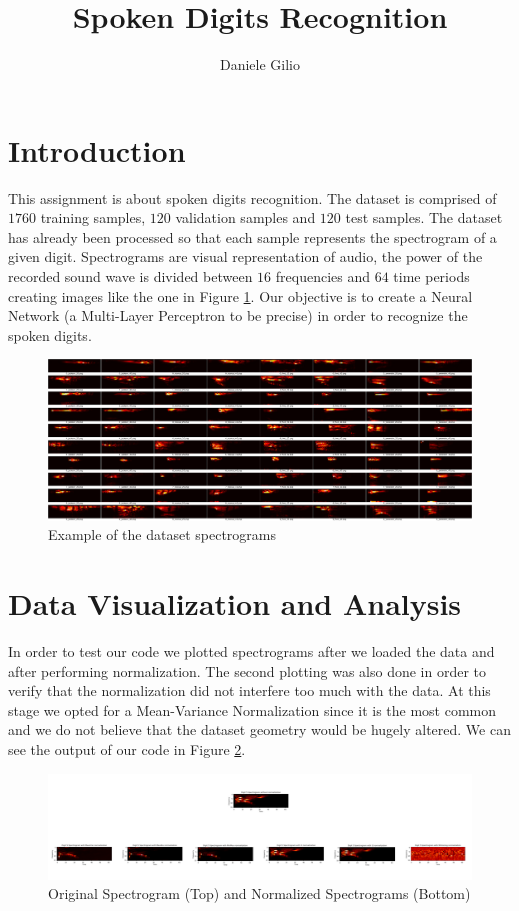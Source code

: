 \documentclass[10pt,a4paper]{report}
\author{Daniele Gilio}
\title{Spoken Digits Recognition}
\begin{document}
\maketitle
\section{Introduction}
This assignment is about spoken digits recognition. The dataset is comprised of $1760$ training samples, $120$ validation samples and $120$ test samples. The dataset has already been processed so that each sample represents the spectrogram of a given digit. Spectrograms are visual representation of audio, the power of the recorded sound wave is divided between $16$ frequencies and $64$ time periods creating images like the one in Figure \ref{fig:data_spect}. Our objective is to create a Neural Network (a Multi-Layer Perceptron to be precise) in order to recognize the spoken digits.
\begin{figure}[!ht]
\centering
\includegraphics[width=\linewidth]{spoken-digits/spectrograms.png}
\caption{Example of the dataset spectrograms}
\label{fig:data_spect}
\end{figure}
\section{Data Visualization and Analysis}
In order to test our code we plotted spectrograms after we loaded the data and after performing normalization. The second plotting was also done in order to verify that the normalization did not interfere too much with the data. At this stage we opted for a Mean-Variance Normalization since it is the most common and we do not believe that the dataset geometry would be hugely altered. We can see the output of our code in Figure \ref{fig:norm_spect}.
\begin{figure}[!ht]
\centering
\includegraphics[width=\linewidth]{norm_spect.png}
\caption{Original Spectrogram (Top) and Normalized Spectrograms (Bottom)}
\label{fig:norm_spect}
\end{figure}
\end{document}
